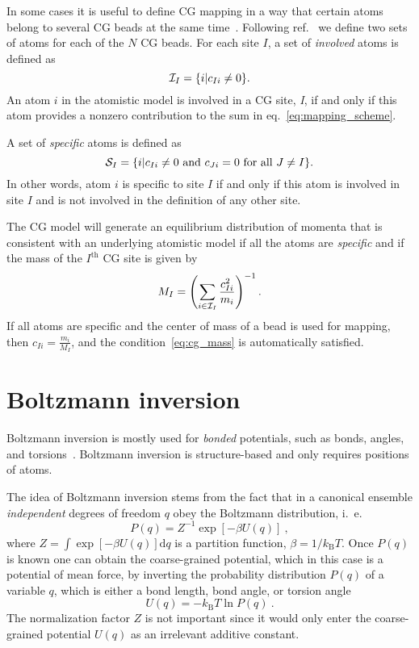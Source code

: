 In some cases it is useful to define CG mapping in a way that certain atoms belong to several CG beads at the same time~\cite{Fritz:2009}. Following ref.~\cite{Noid:2008.1} we define two sets of atoms for each of the $N$ CG beads. For each site $I$, a set of {\em involved} atoms is defined as
\begin{equation}
 {\cal I}_I=\{i|c_{Ii}\ne0\}.
\end{equation}
An atom $i$ in the atomistic model is involved in a CG site, \textit{I}, if and only if this atom provides a nonzero contribution to the sum in eq.~\ref{eq:mapping_scheme}.

A set of {\em specific} atoms is defined as
\begin{equation}
 {\cal S}_I=\{i|c_{Ii}\ne0 \text{ and } c_{Ji}=0 \text{ for all } J \ne I\}.
\end{equation}
In other words, atom $i$ is specific to site $I$ if and only if this atom is involved in site $I$ and is not involved in the definition of any other site.

The CG model will generate an equilibrium distribution of momenta that is consistent with an underlying atomistic model if all the atoms are {\em specific} and if the mass of the $I^\text{th}$ CG site is given by~\cite{Noid:2008.1}
\begin{equation}
M_I= \left( \sum_{i \in {\cal I}_I}\frac{c_{Ii}^2}{m_i} \right)^{-1}.
\label{eq:cg_mass}
\end{equation}
%
If all atoms are specific and the center of mass of a bead is used for mapping, then $c_{Ii} = \frac{m_i}{M_I}$, and the condition~\ref{eq:cg_mass} is automatically satisfied.

\section{Boltzmann inversion}
\label{sec:bi}

Boltzmann inversion is mostly used for {\em bonded} potentials, such as bonds, angles, and torsions~\cite{Tschoep:1998}. Boltzmann inversion is structure-based and only requires positions of atoms.

The idea of Boltzmann inversion stems from the fact that in a canonical ensemble {\em independent} degrees of freedom $q$ obey the Boltzmann distribution, i.~e.
%
\begin{equation}
  P(q) = Z^{-1} \exp\left[ - \beta U(q) \right]~,
  \label{eq:boltzmann}
\end{equation}
%
where \mbox{$Z = \int \exp \left[ - \beta U(q) \right] \text{d}q $} is a partition function, \mbox{$\beta = 1/k_\text{B} T$}.
%
Once $P(q)$ is known one can obtain the coarse-grained potential, which in this case is a potential of mean force, by inverting the probability distribution $P(q)$ of a variable $q$, which is either a bond length, bond angle, or torsion angle
\begin{equation}
  U(q) = - k_\text{B} T \ln  P(q) ~.
  \label{eq:inv_boltzmann}
\end{equation}
%
The normalization factor $Z$ is not important since it would only enter the coarse-grained potential $U(q)$ as an irrelevant additive constant.

